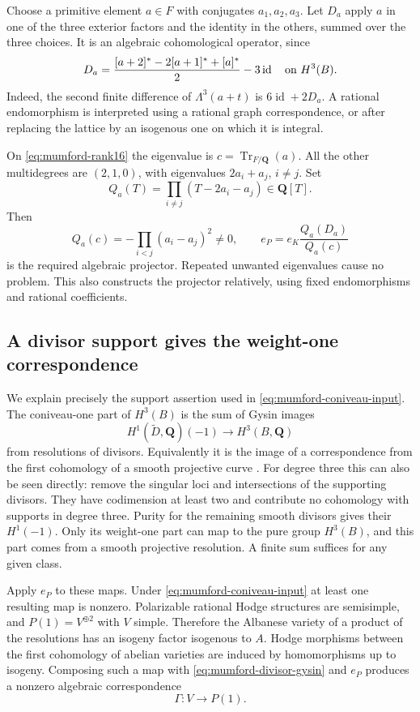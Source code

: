 \documentclass[11pt]{article}
\theoremstyle{definition}
\theoremstyle{remark}
\begin{document}
Choose a primitive element $a\in F$ with conjugates $a_1,a_2,a_3$.
Let $D_a$ apply $a$ in one of the three exterior factors and the
identity in the others, summed over the three choices.  It is an
algebraic cohomological operator, since
\begin{equation}
 D_a=\frac{[a+2]^*-2[a+1]^*+[a]^*}{2}-3\operatorname{id}
       \quad\hbox{on }H^3(B).
 \label{eq:mumford-derivation}
\end{equation}
Indeed, the second finite difference of $\Lambda^3(a+t)$ is
$6\operatorname{id}+2D_a$.  A rational endomorphism is interpreted
using a rational graph correspondence, or after replacing the lattice
by an isogenous one on which it is integral.

On \eqref{eq:mumford-rank16} the eigenvalue is
$c=\operatorname{Tr}_{F/\mathbf Q}(a)$.
All the other multidegrees are $(2,1,0)$, with eigenvalues
$2a_i+a_j$, $i\ne j$.  Set
\[
 Q_a(T)=\prod_{i\ne j}(T-2a_i-a_j)\in\mathbf Q[T].
\]
Then
\[
 Q_a(c)=-\prod_{i<j}(a_i-a_j)^2\ne0,
 \qquad e_P=e_K\frac{Q_a(D_a)}{Q_a(c)}
\]
is the required algebraic projector.  Repeated unwanted eigenvalues
cause no problem.  This also constructs the projector relatively,
using fixed endomorphisms and rational coefficients.

\subsection{A divisor support gives the weight-one correspondence}

We explain precisely the support assertion used in
\eqref{eq:mumford-coniveau-input}.  The coniveau-one part of $H^3(B)$
is the sum of Gysin images
\begin{equation}
 H^1(\widetilde D,\mathbf Q)(-1)\longrightarrow H^3(B,\mathbf Q)
 \label{eq:mumford-divisor-gysin}
\end{equation}
from resolutions of divisors.  Equivalently it is the image of a
correspondence from the first cohomology of a smooth projective curve
\cite[Proposition~1.3, p.~9]{ACMV}.  For degree three this can also be seen
directly: remove the singular loci and intersections of the supporting
divisors.  They have codimension at least two and contribute no
cohomology with supports in degree three.  Purity for the remaining
smooth divisors gives their $H^1(-1)$.  Only its weight-one part can
map to the pure group $H^3(B)$, and this part comes from a smooth
projective resolution.  A finite sum suffices for any given class.

Apply $e_P$ to these maps.  Under
\eqref{eq:mumford-coniveau-input} at least one resulting map is
nonzero.  Polarizable rational Hodge structures are semisimple,
and $P(1)=V^{\oplus2}$ with $V$ simple.  Therefore the Albanese
variety of a product of the resolutions has an isogeny factor
isogenous to $A$.  Hodge morphisms between the first cohomology of
abelian varieties are induced by homomorphisms up to isogeny.
Composing such a map with \eqref{eq:mumford-divisor-gysin} and $e_P$
produces a nonzero algebraic correspondence
\begin{equation}
 \Gamma:V\longrightarrow P(1).
 \label{eq:mumford-coniveau-bridge}
\end{equation}
\end{document}
